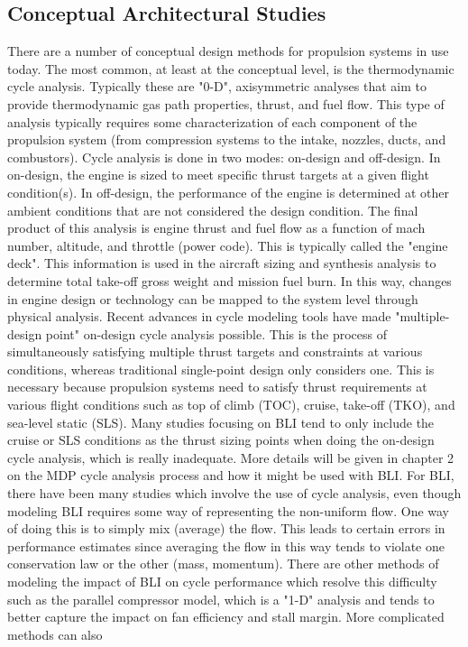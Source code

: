 \documentclass[12pt]{gatech-thesis}
\begin{document}
\subsection{Conceptual Architectural Studies}
There are a number of conceptual design methods for propulsion systems in use today. The most common, at least at the conceptual level, is the thermodynamic cycle analysis. Typically these are "0-D", axisymmetric analyses that aim to provide thermodynamic gas path properties, thrust, and fuel flow. This type of analysis typically requires some characterization of each component of the propulsion system (from compression systems to the intake, nozzles, ducts, and combustors).  Cycle analysis is done in two modes: on-design and off-design. In on-design, the engine is sized to meet specific thrust targets at a given flight condition(s). In off-design, the performance of the engine is determined at other ambient conditions that are not considered the design condition. The final product of this analysis is engine thrust and fuel flow as a function of mach number, altitude, and throttle (power code). This is typically called the "engine deck". This information is used in the aircraft sizing and synthesis analysis to determine total take-off gross weight and mission fuel burn. In this way, changes in engine design or technology can be mapped to the system level through physical analysis.  Recent advances in cycle modeling tools have made "multiple-design point" on-design cycle analysis possible. This is the process of simultaneously satisfying multiple thrust targets and constraints at various conditions, whereas traditional single-point design only considers one. This is necessary because propulsion systems need to satisfy thrust requirements at various flight conditions such as top of climb (TOC), cruise, take-off (TKO), and sea-level static (SLS). Many studies focusing on BLI tend to only include the cruise or SLS conditions as the thrust sizing points when doing the on-design cycle analysis, which is really inadequate. More details will be given in chapter 2 on the MDP cycle analysis process and how it might be used with BLI.  For BLI, there have been many studies which involve the use of cycle analysis, even though modeling BLI requires some way of representing the non-uniform flow.  One way of doing this is to simply mix (average) the flow. This leads to certain errors in performance estimates since averaging the flow in this way tends to violate one conservation law or the other (mass, momentum). There are other methods of modeling the impact of BLI on cycle performance which resolve this difficulty such as the parallel compressor model, which is a "1-D" analysis and tends to better capture the impact on fan efficiency and stall margin. More complicated methods can also
\end{document}
